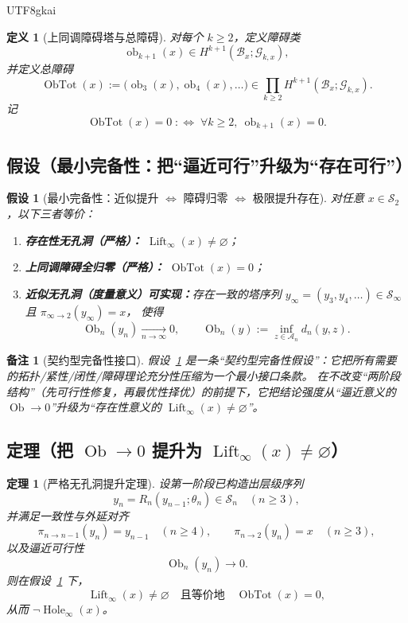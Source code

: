 \documentclass[12pt]{article}
\newtheorem{definition}{定义}[section]
\newtheorem{assumption}{假设}[section]
\newtheorem{theorem}{定理}[section]
\newtheorem{remark}{备注}[section]
\newcommand{\Ob}{\operatorname{Ob}}
\newcommand{\ObTot}{\operatorname{ObTot}}
\newcommand{\Hole}{\operatorname{Hole}}
\newcommand{\Lift}{\operatorname{Lift}}
\begin{document}
\begin{CJK*}{UTF8}{gkai}
\begin{definition}[上同调障碍塔与总障碍]\label{def:obstruction-total}
对每个 $k\ge2$，定义障碍类
\[
\operatorname{ob}_{k+1}(x)\in H^{k+1}(\mathcal B_x;\mathcal G_{k,x}),
\]
并定义总障碍
\[
\ObTot(x):=\bigl(\operatorname{ob}_3(x),\operatorname{ob}_4(x),\dots\bigr)\in\prod_{k\ge2} H^{k+1}(\mathcal B_x;\mathcal
  G_{k,x}).
\]
记
\[
\ObTot(x)=0\;:\Longleftrightarrow\;\forall k\ge2,\ \operatorname{ob}_{k+1}(x)=0.
\]
\end{definition}

\subsection{假设（最小完备性：把“逼近可行”升级为“存在可行”）}

\begin{assumption}[最小完备性：近似提升 $\Leftrightarrow$ 障碍归零 $\Leftrightarrow$ 极限提升存在]\label{ass:min-completeness-approx-ob-exist}
对任意 $x\in\mathcal S_2$，以下三者等价：
\begin{enumerate}
\item \textbf{存在性无孔洞（严格）：}
\(
\Lift_\infty(x)\neq\varnothing
\)；
\item \textbf{上同调障碍全归零（严格）：}
\(
\ObTot(x)=0
\)；
\item \textbf{近似无孔洞（度量意义）可实现：}存在一致的塔序列 $y_\infty=(y_3,y_4,\dots)\in\mathcal S_\infty$ 且 $\pi_{\infty\to2}(y_\infty)=x$，
  使得
\[
\Ob_n(y_n)\xrightarrow[n\to\infty]{}0,
\qquad
\Ob_n(y):=\inf_{z\in\mathcal A_n} d_n(y,z).
\]
\end{enumerate}
\end{assumption}

\begin{remark}[契约型完备性接口]
假设~\ref{ass:min-completeness-approx-ob-exist} 是一条“契约型完备性假设”：它把所有需要的拓扑/紧性/闭性/障碍理论充分性压缩为一个最小接口条款。
在不改变“两阶段结构”（先可行性修复，再最优性择优）的前提下，它把结论强度从“逼近意义的 $\Ob\to0$”升级为“存在性意义的 $\Lift_\infty(x)\neq\varnothing$”。
\end{remark}

\subsection{定理（把 $\Ob\to0$ 提升为 $\Lift_\infty(x)\neq\varnothing$）}

\begin{theorem}[严格无孔洞提升定理]\label{thm:strict-no-hole-lift-from-approx}
设第一阶段已构造出层级序列
\[
y_n = R_n(y_{n-1};\theta_n)\in\mathcal S_n\quad (n\ge3),
\]
并满足一致性与外延对齐
\[
\pi_{n\to n-1}(y_n)=y_{n-1}\quad (n\ge4),
\qquad
\pi_{n\to2}(y_n)=x\quad (n\ge3),
\]
以及逼近可行性
\[
\Ob_n(y_n)\to 0.
\]
则在假设~\ref{ass:min-completeness-approx-ob-exist} 下，
\[
\Lift_\infty(x)\neq\varnothing
\quad\text{且等价地}\quad
\ObTot(x)=0,
\]
从而 $\neg \Hole_\infty(x)$。
\end{theorem}


\end{CJK*}
\end{document}
